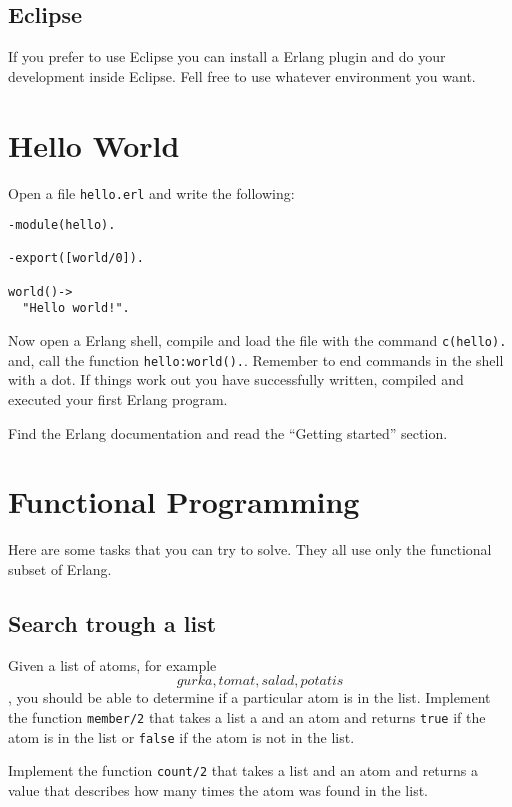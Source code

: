\documentclass[a4paper,11pt]{article}
\begin{document}
\subsection{Eclipse}

If you prefer to use Eclipse you can install a Erlang plugin and do
your development inside Eclipse. Fell free to use whatever
environment you want.

\section{Hello World}

Open a file {\tt hello.erl} and write the following:

\begin{verbatim}
-module(hello).

-export([world/0]).

world()->
  "Hello world!".
\end{verbatim}

\noindent Now open a Erlang shell,  compile and load the file with the command
{\tt c(hello).} and, call the function {\tt hello:world().}.  Remember
to end commands in the shell with a dot. If things work out you have
successfully written, compiled and executed your first Erlang program.

Find the Erlang documentation and read the ``Getting started''
section. 

\section{Functional Programming}

Here are some tasks that you can try to solve. They all use only the
functional subset of Erlang.

\subsection{Search trough a list} 

Given a list of atoms, for example {\tt \[gurka, tomat, salad,
  potatis\]}, you should be able to determine if a particular atom is
in the list. Implement the function {\tt member/2} that takes a list
a and an atom and returns {\tt true} if the atom is in the list or
{\tt false} if the atom is not in the list.

Implement the function {\tt count/2} that takes a list and an atom and
returns a value that describes how many times the atom was found in the list.
\end{document}

